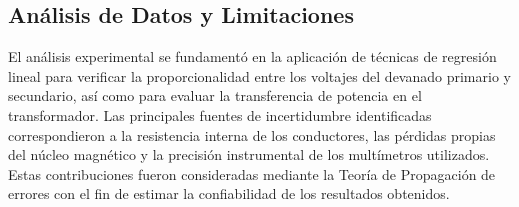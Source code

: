 \subsection{Análisis de Datos y Limitaciones}

El análisis experimental se fundamentó en la aplicación de técnicas de regresión lineal para verificar la proporcionalidad entre los voltajes del devanado primario y secundario, así como para evaluar la transferencia de potencia en el transformador. Las principales fuentes de incertidumbre identificadas correspondieron a la resistencia interna de los conductores, las pérdidas propias del núcleo magnético y la precisión instrumental de los multímetros utilizados. Estas contribuciones fueron consideradas mediante la Teoría de Propagación de errores con el fin de estimar la confiabilidad de los resultados obtenidos.
